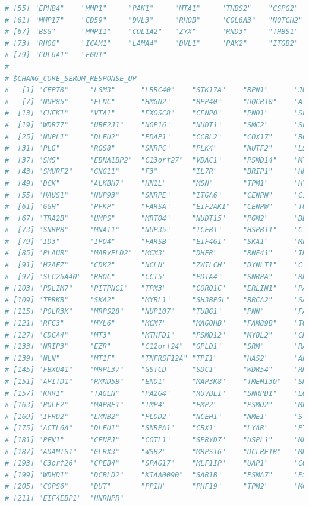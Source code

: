 \documentclass[
  12pt,
]{book}
\begin{document}
\begin{lstlisting}[language=R]
# [55] "EPHB4"    "MMP1"     "PAK1"     "MTA1"     "THBS2"    "CSPG2"   
# [61] "MMP17"    "CD59"     "DVL3"     "RHOB"     "COL6A3"   "NOTCH2"  
# [67] "BSG"      "MMP11"    "COL1A2"   "ZYX"      "RND3"     "THBS1"   
# [73] "RHOG"     "ICAM1"    "LAMA4"    "DVL1"     "PAK2"     "ITGB2"   
# [79] "COL6A1"   "FGD1"    
# 
# $CHANG_CORE_SERUM_RESPONSE_UP
#   [1] "CEP78"     "LSM3"      "LRRC40"    "STK17A"    "RPN1"      "JUNB"     
#   [7] "NUP85"     "FLNC"      "HMGN2"     "RPP40"     "UQCR10"    "AIMP2"    
#  [13] "CHEK1"     "VTA1"      "EXOSC8"    "CENPO"     "PNO1"      "SLC16A1"  
#  [19] "WDR77"     "UBE2J1"    "NOP16"     "NUDT1"     "SMC2"      "SLC25A5"  
#  [25] "NUPL1"     "DLEU2"     "PDAP1"     "CCBL2"     "COX17"     "BCCIP"    
#  [31] "PLG"       "RGS8"      "SNRPC"     "PLK4"      "NUTF2"     "LSM4"     
#  [37] "SMS"       "EBNA1BP2"  "C13orf27"  "VDAC1"     "PSMD14"    "MYCBP"    
#  [43] "SMURF2"    "GNG11"     "F3"        "IL7R"      "BRIP1"     "HNRNPA2B1"
#  [49] "DCK"       "ALKBH7"    "HN1L"      "MSN"       "TPM1"      "HYLS1"    
#  [55] "HAUS1"     "NUP93"     "SNRPE"     "ITGA6"     "CENPN"     "C11orf24" 
#  [61] "GGH"       "PFKP"      "FARSA"     "EIF2AK1"   "CENPW"     "TUBA4A"   
#  [67] "TRA2B"     "UMPS"      "MRTO4"     "NUDT15"    "PGM2"      "DBNDD1"   
#  [73] "SNRPB"     "MNAT1"     "NUP35"     "TCEB1"     "HSPB11"    "C19orf48" 
#  [79] "ID3"       "IPO4"      "FARSB"     "EIF4G1"    "SKA1"      "MFSD11"   
#  [85] "PLAUR"     "MARVELD2"  "MCM3"      "DHFR"      "RNF41"     "ID2"      
#  [91] "H2AFZ"     "CDK2"      "NCLN"      "ZWILCH"    "DYNLT1"    "C16orf61" 
#  [97] "SLC25A40"  "RHOC"      "CCT5"      "PDIA4"     "SNRPA"     "RBM14"    
# [103] "PDLIM7"    "PITPNC1"   "TPM3"      "CORO1C"    "ERLIN1"    "PAICS"    
# [109] "TPRKB"     "SKA2"      "MYBL1"     "SH3BP5L"   "BRCA2"     "SAR1A"    
# [115] "POLR3K"    "MRPS28"    "NUP107"    "TUBG1"     "PNN"       "FAM167A"  
# [121] "RFC3"      "MYL6"      "MCM7"      "MAGOHB"    "FAM89B"    "TOMM40"   
# [127] "CDCA4"     "MT3"       "MTHFD1"    "PSMD12"    "MYBL2"     "CKLF"     
# [133] "NRIP3"     "EZR"       "C12orf24"  "GPLD1"     "SRM"       "RAB3B"    
# [139] "NLN"       "MT1F"      "TNFRSF12A" "TPI1"      "HAS2"      "APOO"     
# [145] "FBXO41"    "MRPL37"    "GSTCD"     "SDC1"      "WDR54"     "RNF138"   
# [151] "APITD1"    "RMND5B"    "ENO1"      "MAP3K8"    "TMEM130"   "SNX17"    
# [157] "KRR1"      "TAGLN"     "PA2G4"     "RUVBL1"    "SNRPD1"    "LOXL2"    
# [163] "POLE2"     "MAPRE1"    "IMP4"      "EMP2"      "PSMD2"     "MET"      
# [169] "IFRD2"     "LMNB2"     "PLOD2"     "NCEH1"     "NME1"      "STRA13"   
# [175] "ACTL6A"    "DLEU1"     "SNRPA1"    "CBX1"      "LYAR"      "PTPLB"    
# [181] "PFN1"      "CENPJ"     "COTL1"     "SPRYD7"    "USPL1"     "MRPL12"   
# [187] "ADAMTS1"   "GLRX3"     "WSB2"      "MRPS16"    "DCLRE1B"   "MKKS"     
# [193] "C3orf26"   "CPEB4"     "SPAG17"    "MLF1IP"    "UAP1"      "COQ2"     
# [199] "WDHD1"     "DCBLD2"    "KIAA0090"  "SAR1B"     "PSMA7"     "PSMC3"    
# [205] "COPS6"     "DUT"       "PPIH"      "PHF19"     "TPM2"      "MCTS1"    
# [211] "EIF4EBP1"  "HNRNPR"
\end{lstlisting}
\end{document}

